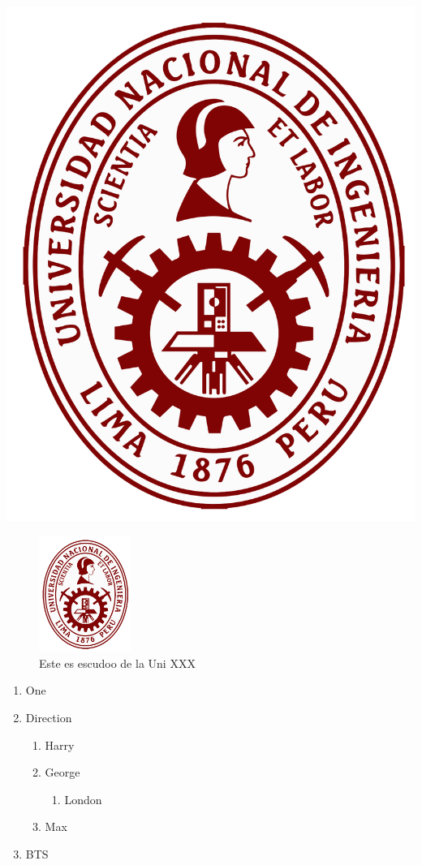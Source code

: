\documentclass[12pt,a4paper]{article}
\begin{document}
\begin{center}
	\includegraphics[scale=0.1]{escudo}
\end{center}

\begin{figure}[H]
	\centering
	\includegraphics[width=3cm]{escudo}
	\caption{Este es escudoo de la Uni XXX}\label{fig2}
\end{figure}

\begin{enumerate}
	\item One
	\item Direction
	\begin{enumerate}
		\item Harry
		\item George
		\begin{enumerate}
			\item London
		\end{enumerate}
		\item Max
	\end{enumerate}
	\item BTS
\end{enumerate}
\end{document}
